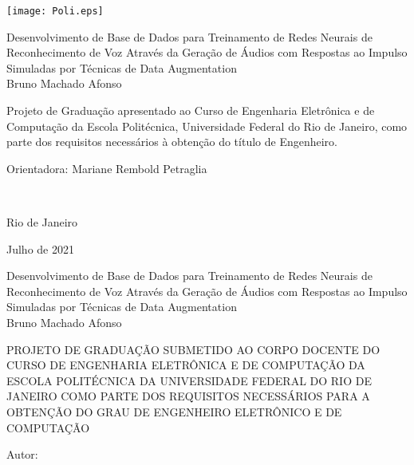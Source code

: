 \texttt{[image: Poli.eps]}

\begin{center}
\large{Desenvolvimento de Base de Dados para Treinamento de Redes Neurais de Reconhecimento de Voz Através da Geração de Áudios com Respostas
ao Impulso Simuladas por Técnicas de Data Augmentation}\\
   \vspace{2cm}
\large{Bruno Machado Afonso}\\
\end{center}
   \vspace{3cm}
\hspace{7cm}
\hfill \parbox{8.0cm}{Projeto de Graduação apresentado ao Curso de Engenharia Eletrônica e de Computação da Escola Politécnica,
Universidade Federal do Rio de Janeiro, como parte dos requisitos necessários à obtenção do título de Engenheiro.\\}
   \vspace{1cm}
\hfill \parbox{8.0cm}{Orientadora: Mariane Rembold Petraglia} \\
   \vspace{1cm}
\begin{center}
Rio de Janeiro

Julho de 2021
\end{center}

\pagebreak


\begin{center}
\large{Desenvolvimento de Base de Dados para Treinamento de Redes Neurais de Reconhecimento de Voz Através da Geração de Áudios com Respostas
ao Impulso Simuladas por Técnicas de Data Augmentation}\\
   \vspace{1cm}
\large{Bruno Machado Afonso}\\
\end{center}
   \vspace{2cm}
PROJETO DE GRADUAÇÃO SUBMETIDO AO CORPO DOCENTE DO CURSO DE ENGENHARIA ELETRÔNICA E DE COMPUTAÇÃO DA ESCOLA POLITÉCNICA DA
UNIVERSIDADE FEDERAL DO RIO DE JANEIRO COMO PARTE DOS REQUISITOS NECESSÁRIOS PARA A OBTENÇÃO DO GRAU DE ENGENHEIRO ELETRÔNICO E DE COMPUTAÇÃO   
   
   \vspace{1cm}
Autor:
      \vspace{0.5cm}
      \begin{flushright}
         \parbox{10cm}{
            \hrulefill

            \vspace{-.375cm}

            \vspace{0.1cm}
         }
      \end{flushright}
      
